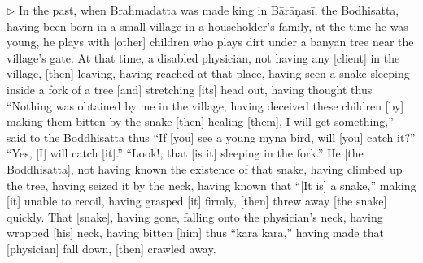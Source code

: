 \addtocounter{sennum}{-6}
$\triangleright$  In the past, when Brahmadatta was made king in B\=ar\=a\d nas\=i, the Bodhisatta, having been born in a small village in a householder's family, at the time he was young, he plays with [other] children who plays dirt under a banyan tree near the village's gate.  At that time, a disabled physician, not having any [client] in the village, [then] leaving, having reached at that place, having seen a snake sleeping inside a fork of a tree [and] stretching [its] head out, having thought thus ``Nothing was obtained by me in the village; having deceived these children [by] making them bitten by the snake [then] healing [them], I will get something,'' said to the Boddhisatta thus ``If [you] see a young myna bird, will [you] catch it?''  ``Yes, [I] will catch [it].''  ``Look!, that [is it] sleeping in the fork.''  He [the Boddhisatta], not having known the existence of that snake, having climbed up the tree, having seized it by the neck, having known that ``[It is] a snake,'' making [it] unable to recoil, having grasped [it] firmly, [then] threw away [the snake] quickly.  That [snake], having gone, falling onto the physician's neck, having wrapped [his] neck, having bitten [him] thus ``kara kara,'' having made that [physician] fall down, [then] crawled away.\\

